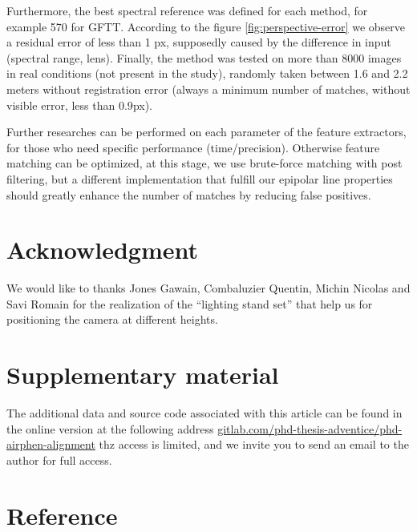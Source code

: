 \documentclass[]{elsarticle}
\begin{document}
	Furthermore, the best spectral reference was defined for each method, for example 570 for GFTT.
	According to the figure \ref{fig:perspective-error} we observe a residual error of less than 1 px,
	supposedly caused by the difference in input (spectral range, lens).
	Finally, the method was tested on more than 8000 images in real conditions (not present in the study),
	randomly taken between 1.6 and 2.2 meters without registration error (always a minimum number of matches, without visible error, less than $0.9$px).
	\\
	\par Further researches can be performed on each parameter of the feature extractors, for those who need specific performance (time/precision).
	Otherwise feature matching can be optimized, at this stage, we use brute-force matching with post filtering,
	but a different implementation that fulfill our epipolar line properties should greatly enhance the number of matches by reducing false positives.
	
	\newpage
	
	\section{Acknowledgment}
	
	We would like to thanks Jones Gawain, Combaluzier Quentin, Michin Nicolas and Savi Romain
	for the realization of the ``lighting stand set'' that help us for positioning the camera at different heights.
	
	\section{Supplementary material}
	
	The additional data and source code associated with this article can be found in the online version at the following address
	\url{gitlab.com/phd-thesis-adventice/phd-airphen-alignment} thz access is limited,
	and we invite you to send an email to the author for full access.
	
	\section{Reference}
	
	
	
\end{document}
